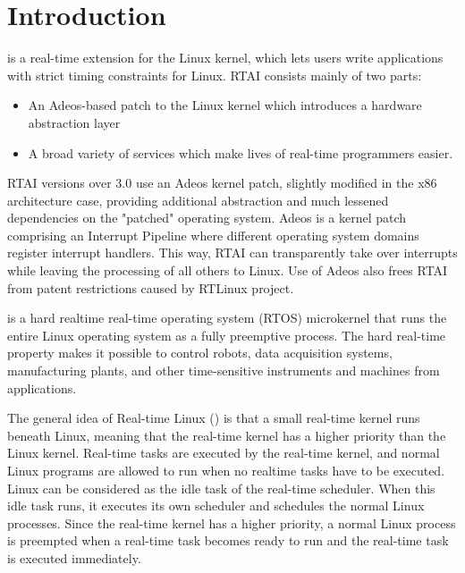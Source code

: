 \section{Introduction}\label{sec:introduction}
\rtai is a real-time extension for the Linux kernel, which lets users write applications with strict timing constraints for Linux. RTAI consists mainly of two parts: 
\begin{itemize}
    \item[] An Adeos-based patch to the Linux kernel which introduces a hardware abstraction layer
    \item[] A broad variety of services which make lives of real-time programmers easier. 
\end{itemize}
RTAI versions over 3.0 use an Adeos kernel patch, slightly modified in the x86 architecture case, providing additional abstraction and much lessened dependencies on the "patched" operating system. Adeos is a kernel patch comprising an Interrupt Pipeline where different operating system domains register interrupt handlers. This way, RTAI can transparently take over interrupts while leaving the processing of all others to Linux. Use of Adeos also frees RTAI from patent restrictions caused by RTLinux project.

\rtlinux \space is a hard realtime real-time operating system (RTOS) microkernel that runs the entire Linux operating system as a fully preemptive process. The hard real-time property makes it possible to control robots, data acquisition systems, manufacturing plants, and other time-sensitive instruments and machines from \rtlinux applications.

The general idea of Real-time Linux (\rtlinux) is that a small real-time kernel runs beneath Linux, meaning that the real-time kernel has a higher priority than the Linux kernel. Real-time tasks are executed by the real-time kernel, and normal Linux programs are allowed to run when no realtime tasks have to be executed. Linux can be considered as the idle task of the real-time scheduler. When this idle task runs, it executes its own scheduler and schedules the normal Linux processes. Since the real-time kernel has a higher priority, a normal Linux process is preempted when a real-time task becomes ready to run and the real-time task is executed immediately.